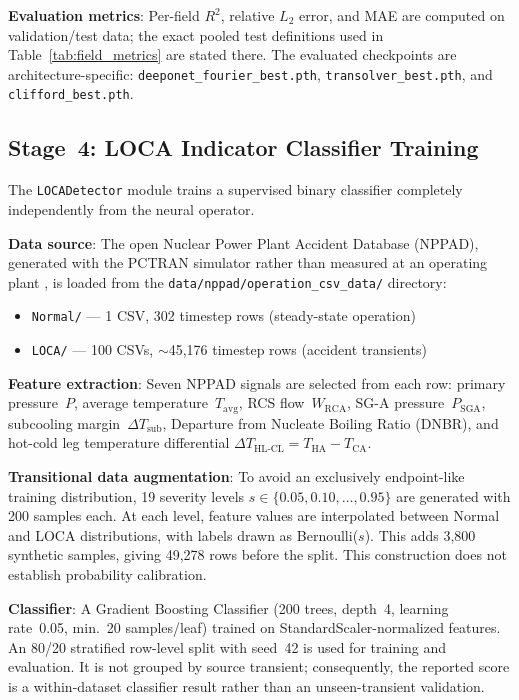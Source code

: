 \documentclass[journal]{IEEEtran}
\newcommand{\added}[1]{#1}
\begin{document}
\textbf{Evaluation metrics}: Per-field $R^2$, relative $L_2$ error, and MAE are computed on validation/test data; the exact pooled test definitions used in Table~\ref{tab:field_metrics} are stated there.  \added{The evaluated checkpoints are architecture-specific: \texttt{deeponet\_fourier\_best.pth}, \texttt{transolver\_best.pth}, and \texttt{clifford\_best.pth}.}

\subsection{Stage~4: LOCA Indicator Classifier Training}

The \texttt{LOCADetector} module trains a supervised binary classifier completely independently from the neural operator.

\textbf{Data source}:  \added{The open Nuclear Power Plant Accident Database (NPPAD), generated with the PCTRAN simulator rather than measured at an operating plant} \cite{qi2022nppad}, is loaded from the \texttt{data/nppad/operation\_csv\_data/} directory:
\begin{itemize}
    \item \texttt{Normal/} --- 1 CSV, 302 timestep rows (steady-state operation)
    \item \texttt{LOCA/} --- 100 CSVs, $\sim$45,176 timestep rows (accident transients)
\end{itemize}

\textbf{Feature extraction}: Seven NPPAD signals are selected from each row: primary pressure~$P$, average temperature~$T_\text{avg}$, RCS flow~$W_\text{RCA}$, SG-A pressure~$P_\text{SGA}$, subcooling margin~$\Delta T_\text{sub}$, Departure from Nucleate Boiling Ratio (DNBR), and hot-cold leg temperature differential $\Delta T_\text{HL-CL} = T_\text{HA} - T_\text{CA}$.

\textbf{Transitional data augmentation}:  \added{To avoid an exclusively endpoint-like training distribution,} 19 severity levels $s \in \{0.05, 0.10, \ldots, 0.95\}$ are generated with 200 samples each. At each level, feature values are interpolated between Normal and LOCA distributions, with labels drawn as Bernoulli($s$). This adds 3,800 synthetic samples, giving 49,278 rows before the split. \added{This construction does not establish probability calibration.}

\textbf{Classifier}: A Gradient Boosting Classifier (200 trees, depth~4, learning rate~0.05, min.\ 20 samples/leaf) trained on StandardScaler-normalized features. \added{An 80/20 stratified row-level split with seed~42 is used for training and evaluation. It is not grouped by source transient; consequently, the reported score is a within-dataset classifier result rather than an unseen-transient validation.}
\end{document}
